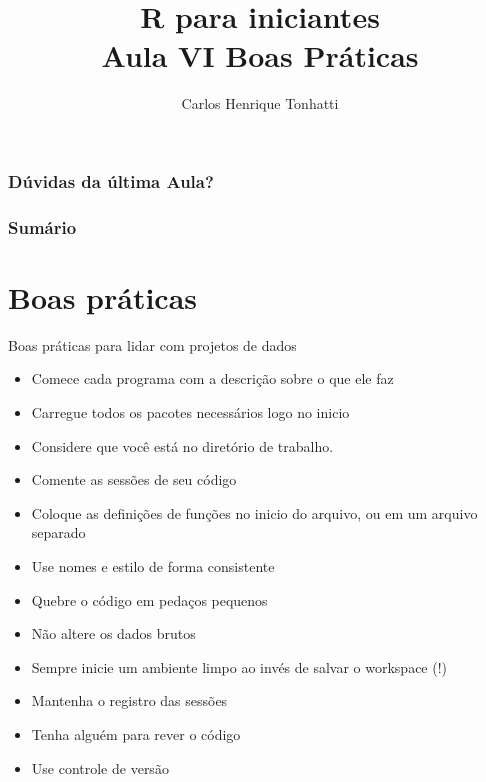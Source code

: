 \documentclass[handout]{beamer}
\title[Linguagem R]{R para iniciantes\\ Aula VI Boas Práticas}
\author {Carlos Henrique Tonhatti}
\institute[Unicamp]{Universidade Estadual de Campinas}
\date{}
\begin{document}
\frame{\titlepage} %

\begin{frame}
  \frametitle{Dúvidas da última Aula?}
\end{frame}

\begin{frame}
 \frametitle{Sumário}
 \tableofcontents[pausesections]
  \setcounter{tocdepth}{2}%
\end{frame}


\section{Boas práticas }

\begin{frame}{Boas práticas para lidar com projetos de dados}

\begin{itemize}
\item Comece cada programa com  a descrição sobre o que ele faz
  
\item Carregue todos os pacotes necessários logo no inicio
  
\item Considere que você está no diretório de trabalho.
  
\item  Comente as sessões de seu código
  
\item Coloque as definições  de funções no inicio do arquivo, ou em um arquivo separado
  
\item Use nomes e estilo de forma consistente
\item Quebre o código em pedaços pequenos 
  
\item Não altere os dados brutos

\item Sempre inicie um ambiente limpo ao invés de salvar o workspace (!)
  
\item Mantenha o registro das sessões
  
\item Tenha alguém para rever o código
  
\item Use controle de versão

  \end{itemize}
\end{frame}
\end{document}
